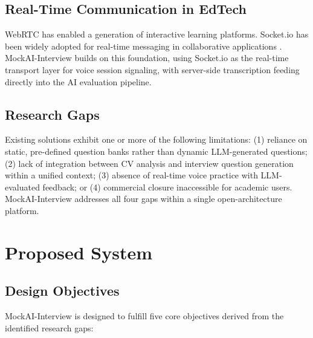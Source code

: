 \documentclass[pdflatex,sn-mathphys-num]{sn-jnl}%
\theoremstyle{thmstyleone}%
\theoremstyle{thmstyletwo}%
\theoremstyle{thmstylethree}%
\begin{document}
\subsection{Real-Time Communication in EdTech}\label{subsec2-3}

WebRTC has enabled a generation of interactive learning platforms. Socket.io has been widely adopted for real-time messaging in collaborative applications \cite{wang2020real}. MockAI-Interview builds on this foundation, using Socket.io as the real-time transport layer for voice session signaling, with server-side transcription feeding directly into the AI evaluation pipeline.

\subsection{Research Gaps}\label{subsec2-4}

Existing solutions exhibit one or more of the following limitations: (1) reliance on static, pre-defined question banks rather than dynamic LLM-generated questions; (2) lack of integration between CV analysis and interview question generation within a unified context; (3) absence of real-time voice practice with LLM-evaluated feedback; or (4) commercial closure inaccessible for academic users. MockAI-Interview addresses all four gaps within a single open-architecture platform.

\section{Proposed System}\label{sec3}

\subsection{Design Objectives}\label{subsec3-obj}

MockAI-Interview is designed to fulfill five core objectives derived from the identified research gaps:
\end{document}
